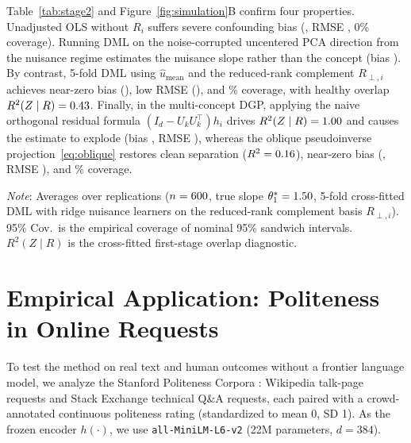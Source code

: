 \documentclass[11pt]{article}
\newcommand{\TableStyle}{\small\setlength{\tabcolsep}{5pt}\renewcommand{\arraystretch}{1.05}}
\begin{document}
Table~\ref{tab:stage2} and Figure~\ref{fig:simulation}B confirm four properties. Unadjusted OLS without $R_i$ suffers severe confounding bias (\simOlsBias, RMSE \simOlsRmse, 0\% coverage). Running DML on the noise-corrupted uncentered PCA direction from the nuisance regime estimates the nuisance slope rather than the concept (bias \simPcaBias). By contrast, 5-fold DML using $\hat{u}_{\mathrm{mean}}$ and the reduced-rank complement $R_{\perp, i}$ achieves near-zero bias (\simMeanBias), low RMSE (\simMeanRmse), and \simMeanCov\% coverage, with healthy overlap $R^2(Z \mid R) = 0.43$. Finally, in the multi-concept DGP, applying the naive orthogonal residual formula $(I_d - U_k U_k^\top)h_i$ drives $R^2(Z \mid R) = 1.00$ and causes the estimate to explode (bias \simNaiveBias, RMSE \simNaiveRmse), whereas the oblique pseudoinverse projection~\eqref{eq:oblique} restores clean separation ($R^2 = 0.16$), near-zero bias (\simOblBias, RMSE \simOblRmse), and \simOblCov\% coverage.

\begin{table}[htbp]
\centering\TableStyle
\caption{Stage 2 causal estimation performance across projection specifications.}
\label{tab:stage2}
\begin{minipage}{0.95\linewidth}\footnotesize
\emph{Note}: Averages over \simNReps{} replications ($n = 600$, true slope $\theta_1^* = 1.50$, 5-fold cross-fitted DML with ridge nuisance learners on the reduced-rank complement basis $R_{\perp, i}$). 95\% Cov.\ is the empirical coverage of nominal 95\% sandwich intervals. $R^2(Z \mid R)$ is the cross-fitted first-stage overlap diagnostic.
\end{minipage}
\end{table}

\section{Empirical Application: Politeness in Online Requests}

To test the method on real text and human outcomes without a frontier language model, we analyze the Stanford Politeness Corpora \citep{danescu2013computational}: \empNWiki{} Wikipedia talk-page requests and \empNSe{} Stack Exchange technical Q\&A requests, each paired with a crowd-annotated continuous politeness rating (standardized to mean 0, SD 1). As the frozen encoder $h(\cdot)$, we use \texttt{all-MiniLM-L6-v2} (22M parameters, $d = 384$).
\end{document}
